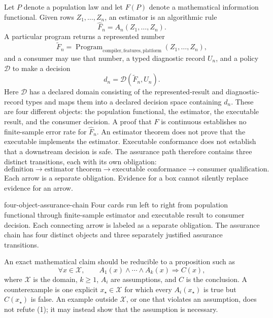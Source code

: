 \documentclass[11pt]{article}
\begin{document}
Let \(P\) denote a population law and let \(F(P)\) denote a mathematical information functional.
Given rows \(Z_1,\ldots,Z_n\), an estimator is an algorithmic rule
\[
  \widehat F_n=A_n(Z_1,\ldots,Z_n).
\]
A particular program returns a represented number
\[
  \widetilde F_n
  =\operatorname{Program}_{\mathrm{compiler,features,platform}}
    (Z_1,\ldots,Z_n),
\]
and a consumer may use that number, a typed diagnostic record \(U_n\), and a policy \(\mathcal D\)
to make a decision
\[
  d_n=\mathcal D(\widetilde F_n,U_n).
\]
Here \(\mathcal D\) has a declared domain consisting of the represented-result and
diagnostic-record types and maps them into a declared decision space containing \(d_n\). These are
four different objects: the population functional, the estimator, the executable
result, and the consumer decision.  A proof that \(F\) is continuous establishes no finite-sample
error rate for \(\widehat F_n\).  An estimator theorem does not prove that the executable implements
the estimator.  Executable conformance does not establish that a downstream decision is safe.
The assurance path therefore contains three distinct transitions, each with its own obligation:
\begingroup\small
\[
  \boxed{\text{definition}}
  \longrightarrow
  \boxed{\text{estimator theorem}}
  \longrightarrow
  \boxed{\text{executable conformance}}
  \longrightarrow
  \boxed{\text{consumer qualification}}.
\]
\endgroup
Each arrow is a separate obligation.  Evidence for a box cannot silently replace evidence for an
arrow.

\PidWorkflowFigure
  {four-object-assurance-chain}
  {Four cards run left to right from population functional through finite-sample estimator and executable result to consumer decision. Each connecting arrow is labeled as a separate obligation.}
  {The assurance chain has four distinct objects and three separately justified assurance transitions.}
\FloatBarrier


An exact mathematical claim should be reducible to a proposition such as
\[
  \forall x\in\mathcal X,\qquad
  A_1(x)\wedge\cdots\wedge A_k(x)\Longrightarrow C(x),
  \tag{1}
\]
where \(\mathcal X\) is the domain, \(k\geq 1\), \(A_i\) are assumptions, and \(C\) is the conclusion.  A
counterexample is one explicit \(x_\star\in\mathcal X\) for which every \(A_i(x_\star)\) is true
but \(C(x_\star)\) is false.  An example outside \(\mathcal X\), or one that violates an assumption,
does not refute (1); it may instead show that the assumption is necessary.
\end{document}
